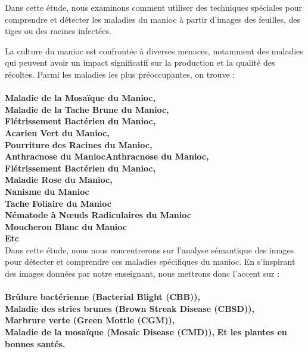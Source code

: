 \documentclass{article}
\begin{document}
		\quad Dans cette étude, nous examinons comment utiliser des techniques spéciales pour comprendre et détecter les maladies du manioc à partir d'images des feuilles, des tiges ou des racines infectées.
		
		\quad La culture du manioc est confrontée à diverses menaces, notamment des maladies qui peuvent avoir un impact significatif sur la production et la qualité des récoltes. Parmi les maladies les plus préoccupantes\cite{msikita_lutte_nodate}, on trouve : \\ \\
		\textemdash \textbf{  Maladie de la Mosaïque du Manioc, } \\
		\textemdash \textbf{ Maladie de la Tache Brune du Manioc, } \\
		\textemdash \textbf{ Flétrissement Bactérien du Manioc, } \\
		\textemdash \textbf{ Acarien Vert du Manioc, } \\
		\textemdash \textbf{  Pourriture des Racines du Manioc, } \\
		\textemdash \textbf{ Anthracnose du ManiocAnthracnose du Manioc, } \\
		\textemdash \textbf{ Flétrissement Bactérien du Manioc, } \\
		\textemdash \textbf{ Maladie Rose du Manioc, } \\
		\textemdash \textbf{ Nanisme du Manioc } \\
		\textemdash \textbf{ Tache Foliaire du Manioc } \\	
		\textemdash \textbf{ Nématode à Nœuds Radiculaires du Manioc } \\	
		\textemdash \textbf{ Moucheron Blanc du Manioc } \\	
		\textemdash \textbf{ Etc } \\	
		
		Dans cette étude, nous nous concentrerons sur l'analyse sémantique des images pour détecter et comprendre ces maladies spécifiques du manioc. En s'inspirant des images données par notre enseignant, nous mettrons donc l'accent sur : \\ \\
		\textemdash \textbf{ Brûlure bactérienne (Bacterial Blight (CBB)), } \\
		\textemdash \textbf{ Maladie des stries brunes (Brown Streak Disease (CBSD)), } \\
		\textemdash \textbf{ Marbrure verte (Green Mottle (CGM)), } \\
		\textemdash \textbf{ Maladie de la mosaïque (Mosaic Disease (CMD)), } \textemdash \textbf{ Et les plantes en bonnes santés. }
		\\
		
\end{document}

